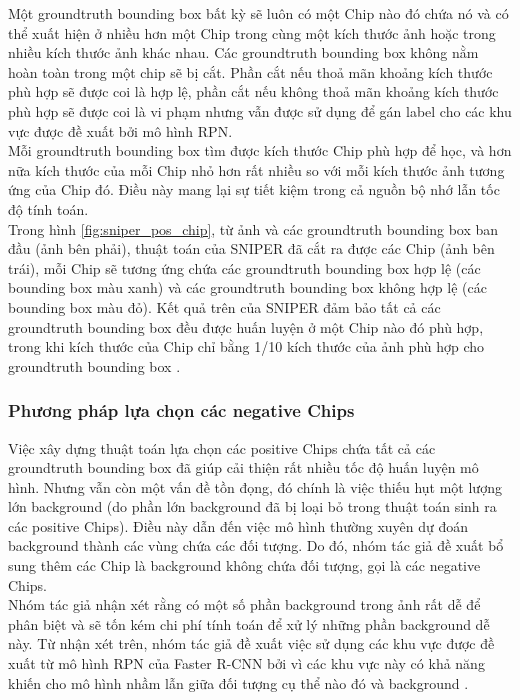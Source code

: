 {    \noindent
    Một groundtruth  bounding box  bất kỳ sẽ luôn có một Chip nào đó chứa nó và có thể xuất hiện ở nhiều hơn một Chip trong cùng một kích thước ảnh hoặc trong nhiều kích thước ảnh khác nhau.
    Các groundtruth  bounding box  không nằm hoàn toàn trong một chip sẽ bị cắt.
    Phần cắt nếu thoả mãn khoảng kích thước phù hợp sẽ được coi là hợp lệ, phần cắt nếu không thoả mãn khoảng kích thước phù hợp sẽ được coi là vi phạm nhưng vẫn được sử dụng để gán label cho các khu vực được đề xuất bởi mô hình RPN. \\
    Mỗi groundtruth  bounding box  tìm được kích thước Chip phù hợp để học, và hơn nữa kích thước của mỗi Chip nhỏ hơn rất nhiều so với mỗi kích thước ảnh tương ứng của Chip đó.
    Điều này mang lại sự tiết kiệm trong cả nguồn bộ nhớ lẫn tốc độ tính toán. \\
    Trong hình \ref{fig:sniper_pos_chip}, từ ảnh và các groundtruth  bounding box  ban đầu (ảnh bên phải), thuật toán của SNIPER  đã cắt ra được các Chip (ảnh bên trái), mỗi Chip sẽ tương ứng chứa các groundtruth  bounding box  hợp lệ (các bounding box  màu xanh) và các groundtruth  bounding box  không hợp lệ (các bounding box  màu đỏ).
    Kết quả trên của SNIPER  đảm bảo tất cả các groundtruth  bounding box  đều được huấn luyện ở một Chip nào đó phù hợp, trong khi kích thước của Chip chỉ bằng 1/10 kích thước của ảnh phù hợp cho groundtruth  bounding box .

    \subsubsection*{Phương pháp lựa chọn các negative Chips}
    Việc xây dựng thuật toán lựa chọn các positive Chips chứa tất cả các groundtruth  bounding box  đã giúp cải thiện rất nhiều tốc độ huấn luyện mô hình.
    Nhưng vẫn còn một vấn đề tồn đọng, đó chính là việc thiếu hụt một lượng lớn background  (do phần lớn background  đã bị loại bỏ trong thuật toán sinh ra các positive Chips).
    Điều này dẫn đến việc mô hình thường xuyên dự đoán background  thành các vùng chứa các đối tượng.
    Do đó, nhóm tác giả đề xuất bổ sung thêm các Chip là background  không chứa đối tượng, gọi là các negative Chips. \\
    Nhóm tác giả nhận xét rằng có một số phần background  trong ảnh rất dễ để phân biệt và sẽ tốn kém chi phí tính toán để xử lý những phần background  dễ này.
    Từ nhận xét trên, nhóm tác giả đề xuất việc sử dụng các khu vực được đề xuất từ mô hình RPN của Faster R-CNN bởi vì các khu vực này có khả năng khiến cho mô hình nhầm lẫn giữa đối tượng cụ thể nào đó và background .

}
